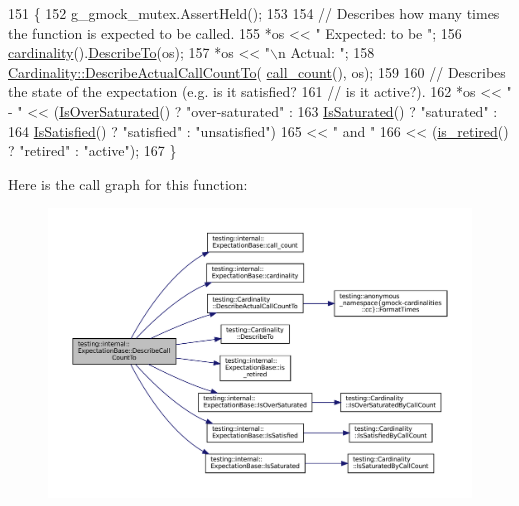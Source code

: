 \begin{DoxyCode}
151                                                   \{
152   g\_gmock\_mutex.AssertHeld();
153 
154   \textcolor{comment}{// Describes how many times the function is expected to be called.}
155   *os << \textcolor{stringliteral}{"         Expected: to be "};
156   \hyperlink{classtesting_1_1internal_1_1ExpectationBase_a1399efffbc8675510a15c6ba1f18184b}{cardinality}().\hyperlink{classtesting_1_1Cardinality_a2955f4b65022c422f56e79b767c4fa71}{DescribeTo}(os);
157   *os << \textcolor{stringliteral}{"\(\backslash\)n           Actual: "};
158   \hyperlink{classtesting_1_1Cardinality_a7cbea339e2f3072a98367e087aa296e8}{Cardinality::DescribeActualCallCountTo}(
      \hyperlink{classtesting_1_1internal_1_1ExpectationBase_aacc0399271907194ac1627439f65047a}{call\_count}(), os);
159 
160   \textcolor{comment}{// Describes the state of the expectation (e.g. is it satisfied?}
161   \textcolor{comment}{// is it active?).}
162   *os << \textcolor{stringliteral}{" - "} << (\hyperlink{classtesting_1_1internal_1_1ExpectationBase_a080dab35ecc6c57096f50758a0e8123d}{IsOverSaturated}() ? \textcolor{stringliteral}{"over-saturated"} :
163                    \hyperlink{classtesting_1_1internal_1_1ExpectationBase_ad3e4340cedefdc24fce1478a8d6cab93}{IsSaturated}() ? \textcolor{stringliteral}{"saturated"} :
164                    \hyperlink{classtesting_1_1internal_1_1ExpectationBase_ae629adc2dd9aee0ac62e50314f1a6449}{IsSatisfied}() ? \textcolor{stringliteral}{"satisfied"} : \textcolor{stringliteral}{"unsatisfied"})
165       << \textcolor{stringliteral}{" and "}
166       << (\hyperlink{classtesting_1_1internal_1_1ExpectationBase_afe539dbc5b29d9635403767a4708c476}{is\_retired}() ? \textcolor{stringliteral}{"retired"} : \textcolor{stringliteral}{"active"});
167 \}
\end{DoxyCode}
Here is the call graph for this function\+:
\nopagebreak
\begin{figure}[H]
\begin{center}
\leavevmode
\includegraphics[width=350pt]{classtesting_1_1internal_1_1ExpectationBase_a2beebed3ade29077bcf294b449bb8b9d_cgraph}
\end{center}
\end{figure}

